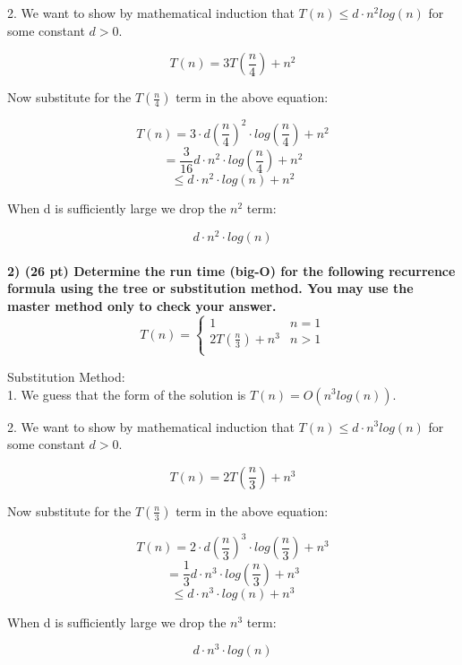 \documentclass[12pt, a4paper]{article}
\begin{document}
2. We want to show by mathematical induction that $ T(n) \leq d \cdot n^2 log(n) $ for some constant $ d > 0 $. 

\[
  T(n) = 3T \left(\frac{n}{4} \right) + n^2
\]
\begin{center}
  Now substitute for the $T \left(\frac{n}{4} \right)$ term in the above equation:
  \end{center}
\[
  T(n) = 3 \cdot d \left(\frac{n}{4} \right)^2 \cdot log \left(\frac{n}{4} \right) + n^2
\]
\[
  = \frac{3}{16} d \cdot n^2 \cdot log \left(\frac{n}{4} \right) + n^2
\]
\[
  \leq d \cdot n^2 \cdot log(n) + n^2
\]
\begin{center}
  When d is sufficiently large we drop the $ n^2 $ term:
\end{center}
\[
  d \cdot n^2 \cdot log(n)
\]
\\

\textbf{2) (26 pt) Determine the run time (big-O) for the following recurrence formula using the tree or substitution method.
You may use the master method only to check your answer.} \\

\[
  T(n) =  
  \begin{cases}
    1 & n = 1  \\
    2T(\frac{n}{3}) + n^3 & n > 1  \\
  \end{cases}
\]

Substitution Method: \\ 

1. We guess that the form of the solution is $ T(n) = O(n^3 log(n)) $.

2. We want to show by mathematical induction that $ T(n) \leq d \cdot n^3 log(n) $ for some constant $ d > 0 $. 

\[
  T(n) = 2T \left(\frac{n}{3} \right) + n^3
\]
\begin{center}
  Now substitute for the $T \left(\frac{n}{3} \right)$ term in the above equation:
\end{center}
\[
  T(n) = 2 \cdot d \left(\frac{n}{3} \right)^3 \cdot log \left(\frac{n}{3} \right) + n^3
\]
\[
  = \frac{1}{3} d \cdot n^3 \cdot log \left(\frac{n}{3} \right) + n^3
\]
\[
  \leq d \cdot n^3 \cdot log(n) + n^3
\]
\begin{center}
  When d is sufficiently large we drop the $ n^3 $ term:
\end{center}
\[
  d \cdot n^3 \cdot log(n)
\]
\\
\newpage
\end{document}
